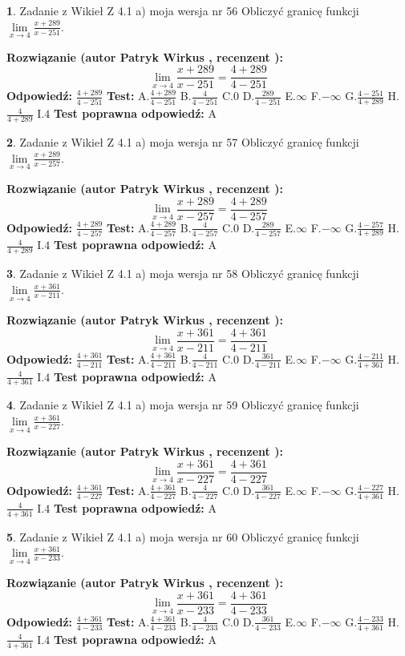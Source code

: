 \documentclass[12pt, a4paper]{article}
\theoremstyle{definition} %
\newtheorem{zad}{}
\newcommand{\zadStart}[1]{\begin{zad}#1\newline}
\newcommand{\zadStop}{\end{zad}}
\newcommand{\rozwStart}[2]{\noindent \textbf{Rozwiązanie (autor #1 , recenzent #2): }\newline}
\newcommand{\rozwStop}{\newline}
\newcommand{\odpStart}{\noindent \textbf{Odpowiedź:}\newline}
\newcommand{\odpStop}{\newline}
\newcommand{\testStart}{\noindent \textbf{Test:}\newline}
\newcommand{\testStop}{\newline}
\newcommand{\kluczStart}{\noindent \textbf{Test poprawna odpowiedź:}\newline}
\newcommand{\kluczStop}{\newline}
\begin{document}
\zadStart{Zadanie z Wikieł Z 4.1 a) moja wersja nr 56}
Obliczyć granicę funkcji $\lim\limits_{x\to4}\frac{x+289}{x-251}$.
\zadStop
\rozwStart{Patryk Wirkus}{}
$$\lim\limits_{x\to4}\frac{x+289}{x-251} = \frac{4+289}{4-251}$$
\rozwStop
\odpStart
$\frac{4+289}{4-251}$
\odpStop
\testStart
A.$\frac{4+289}{4-251}$
B.$\frac{4}{4-251}$
C.$0$
D.$\frac{289}{4-251}$
E.$\infty$
F.$-\infty$
G.$\frac{4-251}{4+289}$
H.$\frac{4}{4+289}$
I.$4$
\testStop
\kluczStart
A
\kluczStop



\zadStart{Zadanie z Wikieł Z 4.1 a) moja wersja nr 57}
Obliczyć granicę funkcji $\lim\limits_{x\to4}\frac{x+289}{x-257}$.
\zadStop
\rozwStart{Patryk Wirkus}{}
$$\lim\limits_{x\to4}\frac{x+289}{x-257} = \frac{4+289}{4-257}$$
\rozwStop
\odpStart
$\frac{4+289}{4-257}$
\odpStop
\testStart
A.$\frac{4+289}{4-257}$
B.$\frac{4}{4-257}$
C.$0$
D.$\frac{289}{4-257}$
E.$\infty$
F.$-\infty$
G.$\frac{4-257}{4+289}$
H.$\frac{4}{4+289}$
I.$4$
\testStop
\kluczStart
A
\kluczStop



\zadStart{Zadanie z Wikieł Z 4.1 a) moja wersja nr 58}
Obliczyć granicę funkcji $\lim\limits_{x\to4}\frac{x+361}{x-211}$.
\zadStop
\rozwStart{Patryk Wirkus}{}
$$\lim\limits_{x\to4}\frac{x+361}{x-211} = \frac{4+361}{4-211}$$
\rozwStop
\odpStart
$\frac{4+361}{4-211}$
\odpStop
\testStart
A.$\frac{4+361}{4-211}$
B.$\frac{4}{4-211}$
C.$0$
D.$\frac{361}{4-211}$
E.$\infty$
F.$-\infty$
G.$\frac{4-211}{4+361}$
H.$\frac{4}{4+361}$
I.$4$
\testStop
\kluczStart
A
\kluczStop



\zadStart{Zadanie z Wikieł Z 4.1 a) moja wersja nr 59}
Obliczyć granicę funkcji $\lim\limits_{x\to4}\frac{x+361}{x-227}$.
\zadStop
\rozwStart{Patryk Wirkus}{}
$$\lim\limits_{x\to4}\frac{x+361}{x-227} = \frac{4+361}{4-227}$$
\rozwStop
\odpStart
$\frac{4+361}{4-227}$
\odpStop
\testStart
A.$\frac{4+361}{4-227}$
B.$\frac{4}{4-227}$
C.$0$
D.$\frac{361}{4-227}$
E.$\infty$
F.$-\infty$
G.$\frac{4-227}{4+361}$
H.$\frac{4}{4+361}$
I.$4$
\testStop
\kluczStart
A
\kluczStop



\zadStart{Zadanie z Wikieł Z 4.1 a) moja wersja nr 60}
Obliczyć granicę funkcji $\lim\limits_{x\to4}\frac{x+361}{x-233}$.
\zadStop
\rozwStart{Patryk Wirkus}{}
$$\lim\limits_{x\to4}\frac{x+361}{x-233} = \frac{4+361}{4-233}$$
\rozwStop
\odpStart
$\frac{4+361}{4-233}$
\odpStop
\testStart
A.$\frac{4+361}{4-233}$
B.$\frac{4}{4-233}$
C.$0$
D.$\frac{361}{4-233}$
E.$\infty$
F.$-\infty$
G.$\frac{4-233}{4+361}$
H.$\frac{4}{4+361}$
I.$4$
\testStop
\kluczStart
A
\kluczStop
\end{document}
